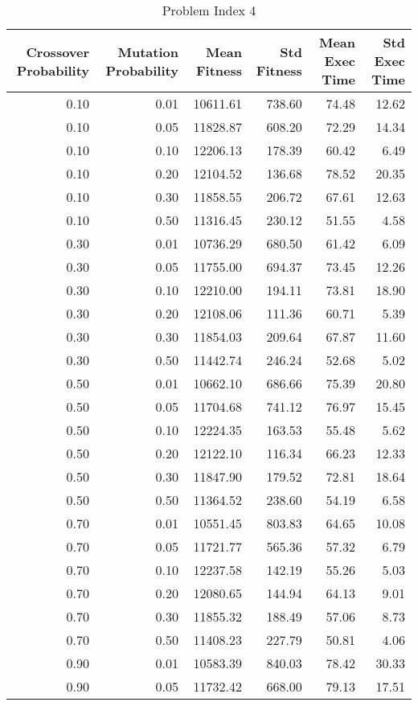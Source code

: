 \begin{table}
\caption{Problem Index 4}
\label{tab:problem_4}
\begin{tabular}{rrrrrr}
\toprule
Crossover Probability & Mutation Probability & Mean Fitness & Std Fitness & Mean Exec Time & Std Exec Time \\
\midrule
0.10 & 0.01 & 10611.61 & 738.60 & 74.48 & 12.62 \\
0.10 & 0.05 & 11828.87 & 608.20 & 72.29 & 14.34 \\
0.10 & 0.10 & 12206.13 & 178.39 & 60.42 & 6.49 \\
0.10 & 0.20 & 12104.52 & 136.68 & 78.52 & 20.35 \\
0.10 & 0.30 & 11858.55 & 206.72 & 67.61 & 12.63 \\
0.10 & 0.50 & 11316.45 & 230.12 & 51.55 & 4.58 \\
0.30 & 0.01 & 10736.29 & 680.50 & 61.42 & 6.09 \\
0.30 & 0.05 & 11755.00 & 694.37 & 73.45 & 12.26 \\
0.30 & 0.10 & 12210.00 & 194.11 & 73.81 & 18.90 \\
0.30 & 0.20 & 12108.06 & 111.36 & 60.71 & 5.39 \\
0.30 & 0.30 & 11854.03 & 209.64 & 67.87 & 11.60 \\
0.30 & 0.50 & 11442.74 & 246.24 & 52.68 & 5.02 \\
0.50 & 0.01 & 10662.10 & 686.66 & 75.39 & 20.80 \\
0.50 & 0.05 & 11704.68 & 741.12 & 76.97 & 15.45 \\
0.50 & 0.10 & 12224.35 & 163.53 & 55.48 & 5.62 \\
0.50 & 0.20 & 12122.10 & 116.34 & 66.23 & 12.33 \\
0.50 & 0.30 & 11847.90 & 179.52 & 72.81 & 18.64 \\
0.50 & 0.50 & 11364.52 & 238.60 & 54.19 & 6.58 \\
0.70 & 0.01 & 10551.45 & 803.83 & 64.65 & 10.08 \\
0.70 & 0.05 & 11721.77 & 565.36 & 57.32 & 6.79 \\
0.70 & 0.10 & 12237.58 & 142.19 & 55.26 & 5.03 \\
0.70 & 0.20 & 12080.65 & 144.94 & 64.13 & 9.01 \\
0.70 & 0.30 & 11855.32 & 188.49 & 57.06 & 8.73 \\
0.70 & 0.50 & 11408.23 & 227.79 & 50.81 & 4.06 \\
0.90 & 0.01 & 10583.39 & 840.03 & 78.42 & 30.33 \\
0.90 & 0.05 & 11732.42 & 668.00 & 79.13 & 17.51 \\

\end{tabular}
\end{table}
